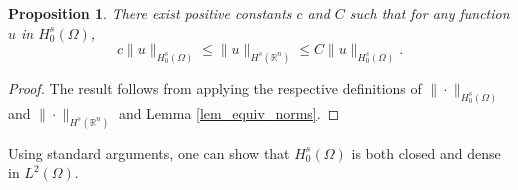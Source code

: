 \documentclass[preprint,12pt]{elsarticle}
\newtheorem{proposition}[theorem]{Proposition}
\newcommand{\R}{\mathbb R}
\newtheorem{lemma}[theorem]{Lemma}
\begin{document}
\begin{proposition}\label{prop_equiv_norms} There exist positive constants $c$ and $C$ such that for any function $u$ in $H^s_0(\Omega)$,
\[
c\|u\|_{H^s_0(\Omega)}\leq \|u\|_{H^s(\R^n)}\leq C\|u\|_{H^s_0(\Omega)}.
\]
\end{proposition}
\begin{proof} The result follows from applying the respective definitions of $\|\cdot\|_{H^s_0(\Omega)}$ and $\|\cdot\|_{H^s(\R^n)}$ and Lemma \ref{lem_equiv_norms}.
\end{proof}

Using standard arguments, one can show that $H^s_0(\Omega)$ is both closed and dense in $L^2(\Omega)$.\\

 

\end{document}
